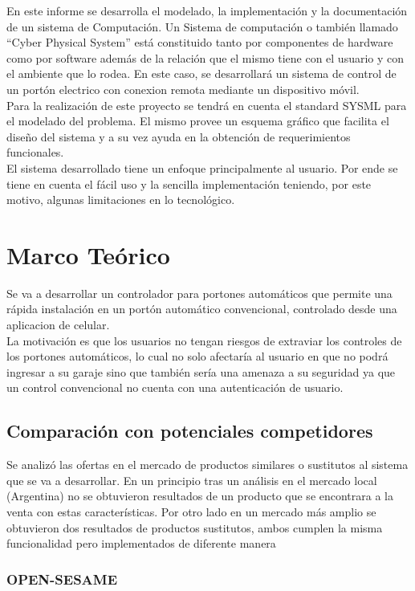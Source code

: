 \documentclass[16pt, article,notitlepage]{article}
\begin{document}
En este informe se desarrolla el modelado, la implementación y la documentación de un sistema de Computación. Un Sistema de computación o también llamado “Cyber Physical System” está constituido tanto por componentes de hardware como por software además de la relación que el mismo tiene con el usuario y con el ambiente que lo rodea. En este caso, se desarrollará un sistema de control de un portón electrico con conexion remota mediante un dispositivo móvil. \\
Para la realización de este proyecto se tendrá en cuenta el standard SYSML para el modelado del problema. El mismo provee un esquema gráfico que facilita el diseño del sistema y a su vez ayuda en la obtención de requerimientos funcionales. \\
El sistema desarrollado tiene un enfoque principalmente al usuario. Por ende se tiene en cuenta el fácil uso y la sencilla implementación teniendo, por este motivo, algunas limitaciones en lo tecnológico.

\section{Marco Teórico}
Se va a desarrollar un controlador para portones automáticos que permite una rápida instalación en un portón automático convencional, controlado desde una aplicacion de celular. \\
La motivación es que los usuarios no tengan riesgos de extraviar los controles de los portones automáticos, lo cual no solo afectaría al usuario en que no podrá ingresar a su garaje sino que también sería una amenaza a su seguridad ya que un control convencional no cuenta con una autenticación de usuario. 
\subsection{Comparación con potenciales competidores}

Se analizó las ofertas en el mercado de productos similares o sustitutos al sistema que se va a desarrollar. En un principio tras un análisis en el mercado local (Argentina) no se obtuvieron resultados de un producto que se encontrara a la venta con estas características.
Por otro lado en un mercado más amplio se obtuvieron dos resultados de productos sustitutos, ambos cumplen la misma funcionalidad pero implementados de diferente manera
\subsubsection{OPEN-SESAME}
\end{document}
